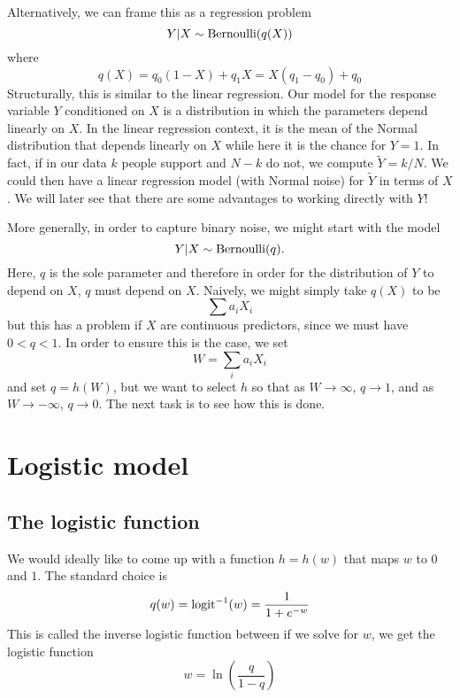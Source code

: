 Alternatively, we can frame this as a regression problem
\begin{equation}
Y|X \sim {\rm Bernoulli}(q(X))
\end{equation}
where 
\begin{equation}
q(X) = q_0(1-X) + q_1X = X(q_1-q_0) + q_0
\end{equation}
Structurally, this is similar to the linear regression.  Our model for the response variable $Y$ conditioned on $X$ is a distribution in which the parameters depend linearly on $X$.  In the linear regression context, it is the mean of the Normal distribution that depends linearly on $X$ while here it is the chance for $Y=1$.  In fact, if in our data $k$ people support and $N-k$ do not, we compute $\tilde{Y} = k/N$. We could then have a linear regression model (with Normal noise) for $\tilde{Y}$ in terms of $X$. We will later see that there are some advantages to working directly with $Y$!




More generally, in order to capture binary noise, we might start with the model
\begin{equation}
Y|X \sim {\rm Bernoulli}(q).
\end{equation}
Here, $q$ is the sole parameter and therefore in order for the distribution of $Y$ to depend on $X$, $q$ must depend on $X$. Naively, we might simply take $q(X)$ to be 
\begin{equation}
 \sum a_i X_i
\end{equation}
but this has a problem if $X$ are continuous predictors, since we must have $0<q<1$. In order to ensure this is the case, we set 
\begin{equation}
W = \sum_i a_i X_i
\end{equation} 
and set $q = h(W)$, but we want to select $h$ so that as $W \to \infty$, $q \to 1$, and as $W \to -\infty$, $q \to 0$. The next task is to see how this is done. 


\section{Logistic model}

\subsection{The logistic function}

We would ideally like to come up with a function $h = h(w)$ that maps $w$ to $0$ and $1$. The standard choice is \begin{equation}
q(w) = {\rm logit}^{-1}(w) = \frac{1}{1+e^{-w}}
\end{equation}
This is called the inverse logistic function between if we solve for $w$, we get the {\dfn logistic function}
\begin{equation}
w= \ln \left(\frac{q}{1-q} \right)
\end{equation}





